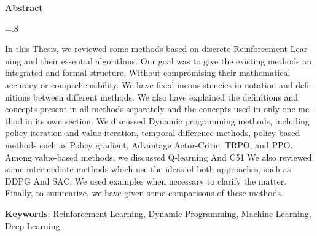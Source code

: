 


\pagestyle{empty}

\begin{latin}

\begin{center}
\textbf{Abstract}
\end{center}
\baselineskip=.8\baselineskip

In this Thesis, we reviewed some methods based on discrete Reinforcement Learning and their essential algorithms.
Our goal was to give the existing methods an integrated and formal structure, Without compromising their mathematical accuracy or comprehensibility.
We have fixed inconsistencies in notation and definitions between different methods.
We also have explained the definitions and concepts present in all methods separately and the concepts used in only one method in its own section.
We discussed Dynamic programming methods, including policy iteration and value iteration, temporal difference methods, policy-based methods such as Policy gradient, Advantage Actor-Critic, TRPO, and PPO.
Among value-based methods, we discussed
Q-learning And C51
We also reviewed some intermediate methods which use the ideas of both approaches, such as DDPG And SAC.
We used examples when necessary to clarify the matter.
Finally, to summarize, we have given some comparisons of these methods. 


\bigskip\noindent\textbf{Keywords}:
Reinforcement Learning, Dynamic Programming, Machine Learning, Deep Learning

\end{latin}

\newpage
